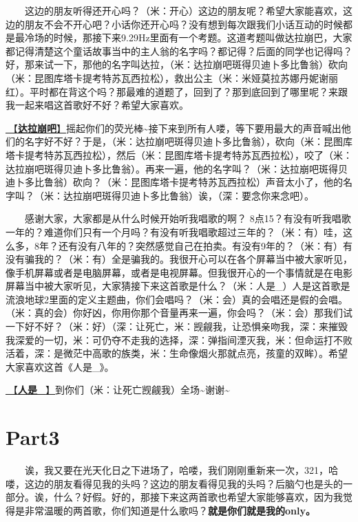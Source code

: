 \documentclass[]{ctexbook}
\begin{document}
  这边的朋友听得还开心吗？（米：开心）这边的朋友呢？希望大家能喜欢，这边的朋友不会不开心吧？小话你还开心吗？没有想到每次跟我们小话互动的时候都是最冷场的时候，那接下来9.29Hz里面有一个考题。这道考题叫做达拉崩巴，大家都记得清楚这个童话故事当中的主人翁的名字吗？都记得？后面的同学也记得吗？好，那来试一下，那他的名字叫达拉，（米：达拉崩吧斑得贝迪卜多比鲁翁）砍向（米：昆图库塔卡提考特苏瓦西拉松），救出公主（米：米娅莫拉苏娜丹妮谢丽红）。平时都在背这个吗？那最难的道题了，回到了？那到底回到了哪里呢？来跟我一起来唱这首歌好不好？希望大家喜欢。

\hyperref[dalabengba]{🎵【\textbf{达拉崩吧}】}摇起你们的荧光棒\textasciitilde 接下来到所有人喽，等下要用最大的声音喊出他们的名字好不好？于是，（米：达拉崩吧斑得贝迪卜多比鲁翁），砍向（米：昆图库塔卡提考特苏瓦西拉松），然后（米：昆图库塔卡提考特苏瓦西拉松），咬了（米：达拉崩吧斑得贝迪卜多比鲁翁）。再来一遍，他的名字叫？（米：达拉崩吧斑得贝迪卜多比鲁翁）砍向？（米：昆图库塔卡提考特苏瓦西拉松）声音太小了，他的名字叫？（米：达拉崩吧斑得贝迪卜多比鲁翁）诶，（深：要念你来念吧）。

  感谢大家，大家都是从什么时候开始听我唱歌的啊？ 8点15？有没有听我唱歌一年的？难道你们只有一个月吗？有没有听我唱歌超过三年的？（米：有）哇，这么多，8年？还有没有八年的？突然感觉自己在拍卖。有没有9年的？（米：有）有没有骗我的？（米：有）全是骗我的。我很开心可以在各个屏幕当中被大家听见，像手机屏幕或者是电脑屏幕，或者是电视屏幕。但我很开心的一个事情就是在电影屏幕当中被大家听见，大家猜接下来这首歌是什么？（米：人是\_）人是这首歌是流浪地球2里面的定义主题曲，你们会唱吗？（米：会）真的会唱还是假的会唱。（米：真的会）你好凶，你用你那个音量再来一遍，你会吗？（米：会）那我们试一下好不好？（米：好）（深：让死亡，米：觊觎我，让恐惧亲吻我，深：来摧毁我深爱的一切，米：可仍夺不走我的选择，深：弹指间湮灭我，米：但命运打不败活着，深：是微茫中高歌的族类，米：生命像烟火那就点亮，孩童的双眸）。希望大家喜欢这首《人是\_》。

\hyperref[renshi]{🎵【\textbf{人是\_}】}到你们（米：让死亡觊觎我）全场\textasciitilde 谢谢\textasciitilde{}

\section{Part3}\label{Seattle-20250305-part3}

  诶，我又要在光天化日之下进场了，哈喽，我们刚刚重新来一次，321，哈喽，这边的朋友看得见我的头吗？这边的朋友看得见我的头吗？后脑勺也是头的一部分。诶，什么？好假。好的，那接下来这两首歌也希望大家能够喜欢，因为我觉得是非常温暖的两首歌，你们知道是什么歌吗？\textbf{就是你们就是我的only。}
\end{document}
